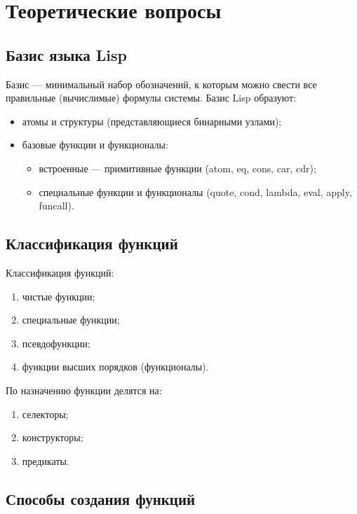 \chapter{Теоретические вопросы}

\section{Базис языка Lisp}

Базис --- минимальный набор обозначений, к которым можно свести все правильные (вычислимые) формулы системы.
Базис Lisp образуют:

\begin{itemize}
	\item атомы и структуры (представляющиеся бинарными узлами);
	\item базовые функции и функционалы:
	\begin{itemize}
		\item встроенные --- примитивные функции (atom, eq, cons, car, cdr);
		\item специальные функции и функционалы (quote, cond, lambda, eval, apply, funcall).
	\end{itemize}
\end{itemize}

\section{Классификация функций}

Классификация функций:
\begin{enumerate}
	\item чистые функции;
	\item специальные функции;
	\item псевдофункции;
	\item функции высших порядков (функционалы).
\end{enumerate}

По назначению функции делятся на:
\begin{enumerate}
	\item селекторы;
	\item конструкторы;
	\item предикаты.
\end{enumerate}

\section{Способы создания функций}


